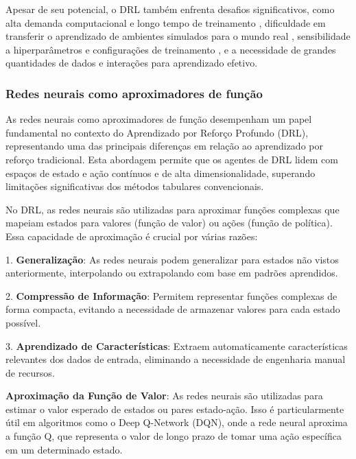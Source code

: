Apesar de seu potencial, o DRL também enfrenta desafios significativos, como alta demanda computacional e longo tempo de treinamento \cite{https://www.semanticscholar.org/paper/8efe27f4a31ebb72e9b3047107a4fe940259aad9}, dificuldade em transferir o aprendizado de ambientes simulados para o mundo real \cite{https://www.semanticscholar.org/paper/fef82649815694167ef56929648a51f2eb0849e9}, sensibilidade a hiperparâmetros e configurações de treinamento \cite{https://www.semanticscholar.org/paper/3879ab51e5eea7ce06dc31edbb169afb76e0bd71}, e a necessidade de grandes quantidades de dados e interações para aprendizado efetivo.


\subsubsection{Redes neurais como aproximadores de função}
\label{subsubsec:redes_neurais}

As redes neurais como aproximadores de função desempenham um papel fundamental no contexto do Aprendizado por Reforço Profundo (DRL), representando uma das principais diferenças em relação ao aprendizado por reforço tradicional. Esta abordagem permite que os agentes de DRL lidem com espaços de estado e ação contínuos e de alta dimensionalidade, superando limitações significativas dos métodos tabulares convencionais.


No DRL, as redes neurais são utilizadas para aproximar funções complexas que mapeiam estados para valores (função de valor) ou ações (função de política). Essa capacidade de aproximação é crucial por várias razões:

1. \textbf{Generalização}: As redes neurais podem generalizar para estados não vistos anteriormente, interpolando ou extrapolando com base em padrões aprendidos.

2. \textbf{Compressão de Informação}: Permitem representar funções complexas de forma compacta, evitando a necessidade de armazenar valores para cada estado possível.

3. \textbf{Aprendizado de Características}: Extraem automaticamente características relevantes dos dados de entrada, eliminando a necessidade de engenharia manual de recursos.


\textbf{Aproximação da Função de Valor}: As redes neurais são utilizadas para estimar o valor esperado de estados ou pares estado-ação. Isso é particularmente útil em algoritmos como o Deep Q-Network (DQN), onde a rede neural aproxima a função Q, que representa o valor de longo prazo de tomar uma ação específica em um determinado estado.


